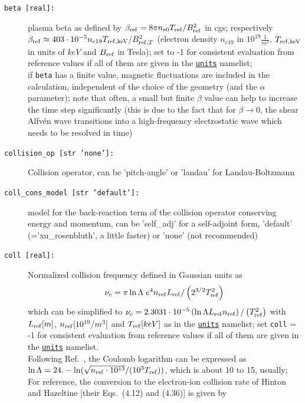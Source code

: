 \documentclass[12pt]{article}
\begin{document}
\begin{description}
\item[\hypertarget{beta}{\tt beta [real]:}] plasma beta as defined by $\beta_{\rm ref}=8\pi
  n_{\mathrm{e}0}T_{\rm ref}/B_{\rm ref}^2$ in cgs; respectively 
  $\beta_{\rm ref}\approx 403\cdot 10^{-5} n_{e19} T_{{\rm ref} ,\mathrm{keV}}/B_{{\rm ref} ,T}^2$
(electron density $n_{e19}$ in $10^{19}\frac{1}{m^3}$, $T_{{\rm ref} ,\mathrm{keV}}$ in units of $keV$ and 
$B_{\rm ref}$ in Tesla); set to -1 for consistent evaluation from reference values if all of them are given 
in the \hyperlink{units_nml}{\tt units} namelist;\\
 if {\tt beta} has a finite value, magnetic fluctuations are included
  in the calculation, independent of the choice of the geometry (and the $\alpha$ parameter); note
  that often, a small but finite $\beta$ value can help to increase the time step significantly (this
  is due to the fact that for $\beta\rightarrow 0$, the shear Alfv\'en wave transitions into a
  high-frequency electrostatic wave which needs to be resolved in time)
\item[\texttt{collision\_op [str 'none']:}] Collision operator, can be 'pitch-angle' or 'landau' for Landau-Boltzmann
\item[\texttt{coll\_cons\_model [str 'default']:}] model for the back-reaction term of the collision operator conserving energy and momentum,
can be 'self\_adj' for a self-adjoint form, 'default'
(='xu\_rosenbluth', a little faster) or 'none' (not recommended)
\item[\hypertarget{coll}{\tt coll [real]:}] Normalized collision
frequency defined in Gaussian units as $$\nu_c=\pi \ln\Lambda\; e^4 n_{\rm ref} L_{\rm ref}/\left(2^{3/2}T_{\rm ref}^2\right)$$ which can be simplified to
$\nu_c = 2.3031\cdot 10^{-5}\left(\ln \Lambda L_{\rm ref} n_{{\rm ref}}\right)/\left(T_{{\rm ref}}^2\right)$ 
with $L_{\rm ref}[m]$, $n_{{\rm ref}}[10^{19}/m^3]$ and $T_{{\rm ref}}[keV]$ as in the \hyperlink{units_nml}{\tt units} namelist; 
set {\tt coll} = -1 for consistent evaluation from reference values if all of
them are given in the \hyperlink{units_nml}{\tt units} namelist. \\
Following Ref.~\cite{nrlformulary}, the Coulomb logarithm can be expressed as
$\ln\Lambda=24.-\ln(\sqrt{n_{{\rm ref}}\cdot10^{13}}/(10^3 T_{{\rm ref}}))$, which is
about 10 to 15, usually;\\
For reference, the conversion to the electron-ion collision rate of Hinton and
Hazeltine\cite{HintonHazeltine1976} [their Eqs.~(4.12) and (4.36)] is given by 
\begin{align*}

\end{align*}
\end{description}
\end{document}

